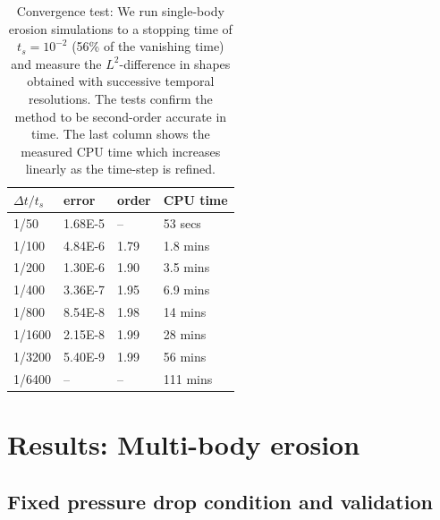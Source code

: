 \documentclass[preprint, 10pt]{elsarticle}
\begin{document}
\begin{table}%
\begin{center}
\caption{Convergence test: We run single-body erosion simulations to a stopping time of $t_s = 10^{-2}$ (56\% of the vanishing time) and measure the $L^2$-difference in shapes obtained with successive temporal resolutions. The tests confirm the method to be second-order accurate in time. The last column shows the measured CPU time which increases linearly as the time-step is refined.
}
\vspace{0.3 pc}
\label{convtab}
\begin{tabular}{l l l l}
\hline
\hspace{0.0pc} $\Delta t/t_s$
\hspace{0.5pc} & error 
\hspace{0.5pc} & order
\hspace{0.5pc} & CPU time \\
\hline
%
1/50		& 1.68E-5		& --		& 53 secs     	\\
1/100	& 4.84E-6		& 1.79	& 1.8 mins   	\\
1/200	& 1.30E-6		& 1.90	& 3.5 mins  	\\
1/400	& 3.36E-7		& 1.95	& 6.9 mins  	\\
1/800	& 8.54E-8		& 1.98	& 14 mins   	\\
1/1600	& 2.15E-8		& 1.99	& 28 mins  	\\
1/3200	& 5.40E-9		& 1.99	& 56 mins    	\\
1/6400	& --			& --		& 111 mins	\\
%
\hline
\end{tabular}
\end{center}
\end{table}




\section{Results: Multi-body erosion}
\label{s:MultiResults}

\subsection{Fixed pressure drop condition and validation}
\end{document}
